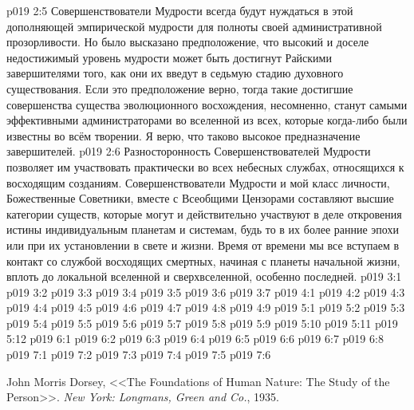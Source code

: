 \vs p019 2:5 Совершенствователи Мудрости всегда будут нуждаться в этой дополняющей эмпирической мудрости для полноты своей административной прозорливости. Но было высказано предположение, что высокий и доселе недостижимый уровень мудрости может быть достигнут Райскими завершителями  того, как они их введут в седьмую стадию духовного существования. Если это предположение верно, тогда такие достигшие совершенства существа эволюционного восхождения, несомненно, станут самыми эффективными администраторами во вселенной из всех, которые когда\hyp{}либо были известны во всём творении. Я верю, что таково высокое предназначение завершителей.
\vs p019 2:6 \pc Разносторонность Совершенствователей Мудрости позволяет им участвовать практически во всех небесных службах, относящихся к восходящим созданиям. Совершенствователи Мудрости и мой класс личности, Божественные Советники, вместе с Всеобщими Цензорами составляют высшие категории существ, которые могут и действительно участвуют в деле откровения истины индивидуальным планетам и системам, будь то в их более ранние эпохи или при их установлении в свете и жизни. Время от времени мы все вступаем в контакт со службой восходящих смертных, начиная с планеты начальной жизни, вплоть до локальной вселенной и сверхвселенной, особенно последней.
\vs p019 3:1 
\vs p019 3:2 
\vs p019 3:3 
\vs p019 3:4 \pc 
\vs p019 3:5 
\vs p019 3:6 \pc 
\vs p019 3:7 
\vs p019 4:1 
\vs p019 4:2 
\vs p019 4:3 
\vs p019 4:4 \pc 
\vs p019 4:5 \pc 
\vs p019 4:6 
\vs p019 4:7 
\vs p019 4:8 \pc 
\vs p019 4:9 
\vs p019 5:1 
\vs p019 5:2 
\vs p019 5:3 
\vs p019 5:4 
\vs p019 5:5 \pc 
\vs p019 5:6 
\vs p019 5:7 
\vs p019 5:8 \pc 
\vs p019 5:9 
\vs p019 5:10 
\vs p019 5:11 
\vs p019 5:12 
\vs p019 6:1 
\vs p019 6:2 
\vs p019 6:3 \pc 
\vs p019 6:4 \pc 
\vs p019 6:5 
\vs p019 6:6 
\vs p019 6:7 
\vs p019 6:8 
\vs p019 7:1 
\vs p019 7:2 \pc 
\vs p019 7:3 \pc 
\vs p019 7:4 
\vs p019 7:5 
\vsetoff
\vs p019 7:6 
\quizlink
\begin{thebibliography}{100}
John Morris Dorsey,
{<<The Foundations of Human Nature: The Study of the Person>>.}
{\em New York: Longmans, Green and Co.}, 1935.
\end{thebibliography}
